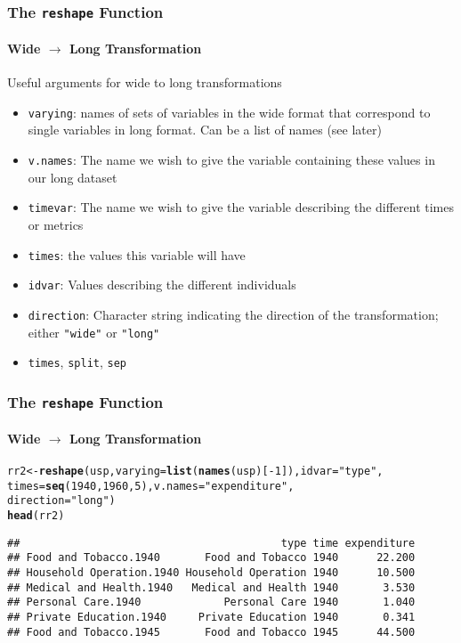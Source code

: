 \documentclass[paper=screen,mathserif]{beamer}\usepackage[]{graphicx}\usepackage[]{color}
\makeatletter
\newcommand{\hlnum}[1]{\textcolor[rgb]{0.686,0.059,0.569}{#1}}%
\newcommand{\hlstr}[1]{\textcolor[rgb]{0.192,0.494,0.8}{#1}}%
\newcommand{\hlopt}[1]{\textcolor[rgb]{0,0,0}{#1}}%
\newcommand{\hlstd}[1]{\textcolor[rgb]{0.345,0.345,0.345}{#1}}%
\newcommand{\hlkwb}[1]{\textcolor[rgb]{0.69,0.353,0.396}{#1}}%
\newcommand{\hlkwc}[1]{\textcolor[rgb]{0.333,0.667,0.333}{#1}}%
\newcommand{\hlkwd}[1]{\textcolor[rgb]{0.737,0.353,0.396}{\textbf{#1}}}%
\newenvironment{kframe}{%
 \def\at@end@of@kframe{}%
 \ifinner\ifhmode%
  \def\at@end@of@kframe{\end{minipage}}%
  \begin{minipage}{\columnwidth}%
 \fi\fi%
 \def\FrameCommand##1{\hskip\@totalleftmargin \hskip-\fboxsep
 \colorbox{shadecolor}{##1}\hskip-\fboxsep
     \hskip-\linewidth \hskip-\@totalleftmargin \hskip\columnwidth}%
 \MakeFramed {\advance\hsize-\width
   \@totalleftmargin\z@ \linewidth\hsize
   \@setminipage}}%
 {\par\unskip\endMakeFramed%
 \at@end@of@kframe}
\newenvironment{knitrout}{}{} %
\newcommand{\ft}[1]{\frametitle{#1}}
\newcommand{\fst}[1]{\framesubtitle{#1}}
\makeatother
\begin{document}
\begin{frame}[fragile]
  \ft{The {\tt reshape} Function}
  \fst{Wide $\rightarrow$ Long Transformation}
  Useful arguments for wide to long transformations
  \begin{itemize}
  \item \verb=varying=: names of sets of variables in the wide format
    that correspond to single variables in long format. Can be a list
    of names (see later)
  \item \verb=v.names=: The name we wish to give the variable
    containing these values in our long dataset
  \item \verb=timevar=: The name we wish to give the variable
    describing the different times or metrics
  \item \verb=times=: the values this variable will have
  \item \verb=idvar=: Values describing the different individuals
  \item \verb=direction=: Character string indicating the direction of
    the transformation; either \verb="wide"= or \verb="long"=
  \item \verb=times=, \verb=split=, \verb=sep=
  \end{itemize}
\end{frame}


\begin{frame}[fragile]
  \ft{The {\tt reshape} Function}
  \fst{Wide $\rightarrow$ Long Transformation}

\begin{knitrout}\scriptsize
{}\color{fgcolor}\begin{kframe}
\begin{alltt}
\hlstd{rr2} \hlkwb{<-} \hlkwd{reshape}\hlstd{(usp,} \hlkwc{varying} \hlstd{=} \hlkwd{list}\hlstd{(}\hlkwd{names}\hlstd{(usp)[}\hlopt{-}\hlnum{1}\hlstd{]),} \hlkwc{idvar} \hlstd{=} \hlstr{"type"}\hlstd{,}
               \hlkwc{times} \hlstd{=} \hlkwd{seq}\hlstd{(}\hlnum{1940}\hlstd{,} \hlnum{1960}\hlstd{,} \hlnum{5}\hlstd{),} \hlkwc{v.names} \hlstd{=} \hlstr{"expenditure"}\hlstd{,}
               \hlkwc{direction} \hlstd{=} \hlstr{"long"}\hlstd{)}
\hlkwd{head}\hlstd{(rr2)}
\end{alltt}
\begin{verbatim}
##                                         type time expenditure
## Food and Tobacco.1940       Food and Tobacco 1940      22.200
## Household Operation.1940 Household Operation 1940      10.500
## Medical and Health.1940   Medical and Health 1940       3.530
## Personal Care.1940             Personal Care 1940       1.040
## Private Education.1940     Private Education 1940       0.341
## Food and Tobacco.1945       Food and Tobacco 1945      44.500
\end{verbatim}
\end{kframe}
\end{knitrout}
\end{frame}
\end{document}
